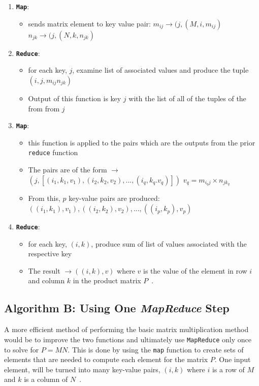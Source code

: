 \documentclass[10pt, conference]{IEEEtran}
\def\code#1{\texttt{#1}}
\begin{document}
\begin{enumerate}
\item \textbf{\code{Map}}:
\begin{itemize}
	\item sends matrix element to key value pair:
		\subitem $m_{ij} \rightarrow (j, (M,i,m_{ij})$
		\subitem $n_{jk} \rightarrow (j, (N,k, n_{jk})$
\end{itemize}

\item \textbf{\code{Reduce}}:
\begin{itemize}
	\item for each key, $j$, examine list of associated values and produce the tuple $(i,j,m_{ij}n_{jk})$
	\item Output of this function is key $j$ with the list of all of the tuples of the from from $j$
\end{itemize}

\item \textbf{\code{Map}}:
\begin{itemize}
	\item this function is applied to the pairs which are the outputs from the prior \code{reduce} function\\
	\item The pairs are of the form $\rightarrow$ 
		\subitem $(j, [(i_1,k_1,v_1), (i_2,k_2,v_2),...,(i_q,k_q.v_q)])$
		\subitem $v_q = m_{i_qj} \times n_{jk_q}$
	\item From this, $p$ key-value pairs are produced:
		\subitem $((i_1,k_1),v_1),((i_2,k_2), v_2),...,((i_p,k_p),v_p)$

\end{itemize}
	
\item \textbf{\code{Reduce}}:
\begin{itemize}
	\item for each key, $(i,k)$, produce sum of list of values associated with the respective key
	\item The result $\rightarrow ((i,k),v)$ where $v$ is the value of the element in row $i$ and column $k$ in the product matrix $P$~\cite{Book}.

\end{itemize}
	
\end{enumerate}

\subsection{Algorithm B: Using One \emph{MapReduce} Step}
\label{Algorithm B}
A more efficient method of performing the basic matrix multiplication method would be to improve the two functions and ultimately use \code{MapReduce} only once to solve for $P=MN$. This is done by using the \code{map} function to create sets of elements that are needed to compute each element for the matrix $P$. One input element, will be turned into many key-value pairs, $(i,k)$ where $i$ is a row of $M$ and $k$ is a column of $N$~\cite{Book}.
\end{document}
